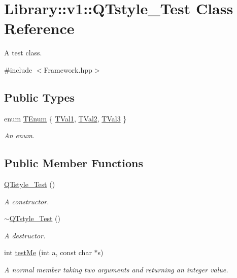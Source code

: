\hypertarget{class_library_1_1v1_1_1_q_tstyle___test}{}\section{Library\+:\+:v1\+:\+:Q\+Tstyle\+\_\+\+Test Class Reference}
\label{class_library_1_1v1_1_1_q_tstyle___test}


A test class.  




{\ttfamily \#include $<$Framework.\+hpp$>$}

\subsection*{Public Types}
\begin{DoxyCompactItemize}
\item 
enum \mbox{\hyperlink{class_library_1_1v1_1_1_q_tstyle___test_ac4bc26cc9920a5addfcea6c9f88e10bf}{T\+Enum}} \{ \mbox{\hyperlink{class_library_1_1v1_1_1_q_tstyle___test_ac4bc26cc9920a5addfcea6c9f88e10bfa31c5a437414084c12c53b24325c17d71}{T\+Val1}}, 
\mbox{\hyperlink{class_library_1_1v1_1_1_q_tstyle___test_ac4bc26cc9920a5addfcea6c9f88e10bfa4452c591c0d890a2624b928a7a8ac141}{T\+Val2}}, 
\mbox{\hyperlink{class_library_1_1v1_1_1_q_tstyle___test_ac4bc26cc9920a5addfcea6c9f88e10bfa8cab8d7360c0d9fcfc66a0953bf3bea3}{T\+Val3}}
 \}
\begin{DoxyCompactList}\small\item\em An enum. \end{DoxyCompactList}\end{DoxyCompactItemize}
\subsection*{Public Member Functions}
\begin{DoxyCompactItemize}
\item 
\mbox{\hyperlink{class_library_1_1v1_1_1_q_tstyle___test_ae7bab88d8f1eaa93d8e39f2e1f06b00e}{Q\+Tstyle\+\_\+\+Test}} ()
\begin{DoxyCompactList}\small\item\em A constructor. \end{DoxyCompactList}\item 
\mbox{\hyperlink{class_library_1_1v1_1_1_q_tstyle___test_a418dfdd3063f4cc861dda19ff1e5864b}{$\sim$\+Q\+Tstyle\+\_\+\+Test}} ()
\begin{DoxyCompactList}\small\item\em A destructor. \end{DoxyCompactList}\item 
int \mbox{\hyperlink{class_library_1_1v1_1_1_q_tstyle___test_a0b4844a356f8d483b80e470d6762248b}{test\+Me}} (int a, const char $\ast$s)
\begin{DoxyCompactList}\small\item\em A normal member taking two arguments and returning an integer value. \end{DoxyCompactList}\end{DoxyCompactItemize}
